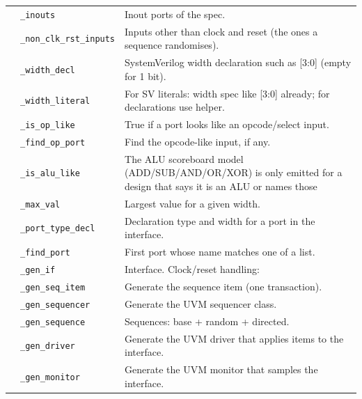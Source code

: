 \begin{longtable}{@{}p{2.8cm}>{\raggedright\arraybackslash}p{4.6cm}p{7.9cm}@{}}
{\small } & \texttt{\small \_\allowbreak{}inouts} & Inout ports of the spec. \\
{\small } & \texttt{\small \_\allowbreak{}non\_\allowbreak{}clk\_\allowbreak{}rst\_\allowbreak{}inputs} & Inputs other than clock and reset (the ones a sequence randomises). \\
{\small } & \texttt{\small \_\allowbreak{}width\_\allowbreak{}decl} & SystemVerilog width declaration such as [3:0] (empty for 1 bit). \\
{\small } & \texttt{\small \_\allowbreak{}width\_\allowbreak{}literal} & For SV literals: width spec like [3:0] already; for declarations use helper. \\
{\small } & \texttt{\small \_\allowbreak{}is\_\allowbreak{}op\_\allowbreak{}like} & True if a port looks like an opcode/select input. \\
{\small } & \texttt{\small \_\allowbreak{}find\_\allowbreak{}op\_\allowbreak{}port} & Find the opcode-like input, if any. \\
{\small } & \texttt{\small \_\allowbreak{}is\_\allowbreak{}alu\_\allowbreak{}like} & The ALU scoreboard model (ADD/SUB/AND/OR/XOR) is only emitted for a design that says it is an ALU or names those \\
{\small } & \texttt{\small \_\allowbreak{}max\_\allowbreak{}val} & Largest value for a given width. \\
{\small } & \texttt{\small \_\allowbreak{}port\_\allowbreak{}type\_\allowbreak{}decl} & Declaration type and width for a port in the interface. \\
{\small } & \texttt{\small \_\allowbreak{}find\_\allowbreak{}port} & First port whose name matches one of a list. \\
{\small } & \texttt{\small \_\allowbreak{}gen\_\allowbreak{}if} & Interface. Clock/reset handling: \\
{\small } & \texttt{\small \_\allowbreak{}gen\_\allowbreak{}seq\_\allowbreak{}item} & Generate the sequence item (one transaction). \\
{\small } & \texttt{\small \_\allowbreak{}gen\_\allowbreak{}sequencer} & Generate the UVM sequencer class. \\
{\small } & \texttt{\small \_\allowbreak{}gen\_\allowbreak{}sequence} & Sequences: base + random + directed. \\
{\small } & \texttt{\small \_\allowbreak{}gen\_\allowbreak{}driver} & Generate the UVM driver that applies items to the interface. \\
{\small } & \texttt{\small \_\allowbreak{}gen\_\allowbreak{}monitor} & Generate the UVM monitor that samples the interface. \\

\end{longtable}
